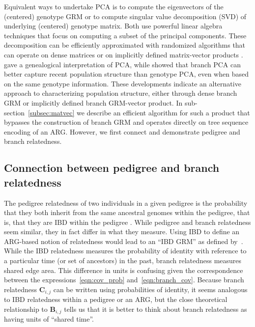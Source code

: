 Equivalent ways to undertake PCA is
to compute the eigenvectors of the (centered) genotype GRM or
to compute singular value decomposition (SVD) of underlying (centered) genotype matrix.
Both use powerful linear algebra techniques that focus on computing a subset of the principal components.
These decomposition can be efficiently approximated with randomized algorithms that can operate on
dense matrices or on implicitly defined matrix-vector products \citep{halko2011findingstructure}.
\citet{mcvean2009genealogical} gave a genealogical interpretation of PCA, while
\citet{fan2022genealogical} showed that branch PCA can better capture recent population structure than genotype PCA,
even when based on the same genotype information.
These developments indicate an alternative approach to characterizing population structure,
either through dense branch GRM or implicitly defined branch GRM-vector product.
In sub-section~\ref{subsec:matvec} we describe an efficient algorithm for
such a product that bypasses the construction of branch GRM
and operates directly on tree sequence encoding of an ARG.
However, we first connect and demonstrate pedigree and branch relatedness.

\subsection{Connection between pedigree and branch relatedness}

The pedigree relatedness of two individuals in a given pedigree is
the probability that they both inherit from the same ancestral genomes within the pedigree,
that is, that they are IBD within the pedigree \citep{malecot1969mathemathics}.
%
While pedigree and branch relatedness seem similar,
they in fact differ in what they measure.
%
Using IBD to define an ARG-based notion of relatedness would lead to an ``IBD GRM''
as defined by~\citet{tsambos2022efficient}.
%
While the IBD relatedness measures the
probability of identity with reference to a particular time (or set of ancestors) in the past,
branch relatedness measures shared edge area.
%
This difference in units is confusing given the correspondence between
the expressions~\eqref{eqn:cov_prob} and~\eqref{eqn:branch_cov}.
%
Because branch relatedness $\mathbf{C}_{i,j}$ can be written using probabilities of identity,
it seems analogous to IBD relatedness within a pedigree or an ARG,
but the close theoretical relationship to $\mathbf{B}_{i,j}$
tells us that it is better to think about branch relatedness as having units of ``shared time''.


